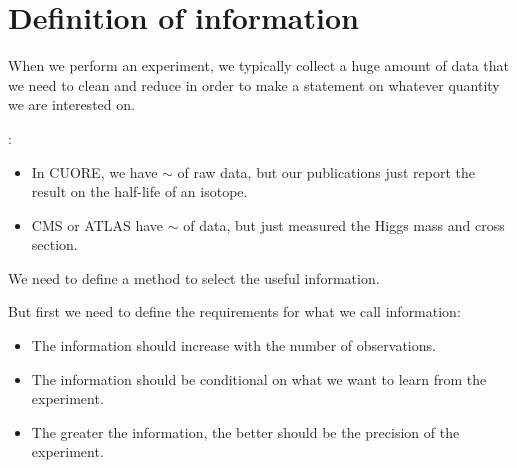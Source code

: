 

\section{Definition of information}
\label{sec:def_of_info}

When we perform an experiment, we typically collect a huge amount of data that we need to clean and reduce in order to make a statement on whatever quantity we are interested on.

:

\begin{itemize}[$\to$]
	\item In CUORE, we have $\sim$  of raw data, but our publications just report the result on the half-life of an isotope.
	\item CMS or ATLAS have $\sim$  of data, but just measured the Higgs mass and cross section.
\end{itemize}

We need to define a method to select the useful information. 

But first we need to define the requirements for what we call information:

\begin{itemize}[$\to$]
	\item The information should increase with the number of observations.
	\item The information should be conditional on what we want to learn from the experiment.
	\item The greater the information, the better should be the precision of the experiment.
\end{itemize}

